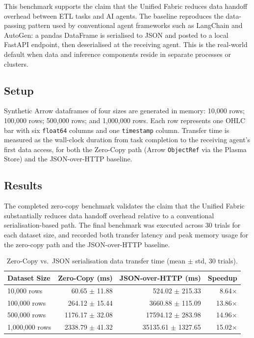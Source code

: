 \documentclass[12pt, a4paper]{report}
\begin{document}
This benchmark supports the claim that the Unified Fabric reduces data handoff
overhead between ETL tasks and AI agents.
The baseline reproduces the data-passing pattern used by conventional agent
frameworks such as LangChain and AutoGen: a pandas DataFrame is serialised to JSON
and posted to a local FastAPI endpoint, then deserialised at the receiving agent.
This is the real-world default when data and inference components reside in separate
processes or clusters.

\subsection{Setup}
\label{ssec:exp1_setup}

Synthetic Arrow dataframes of four sizes are generated in memory:
10,000 rows; 100,000 rows; 500,000 rows; and 1,000,000 rows.
Each row represents one OHLC bar with six \texttt{float64} columns and one
\texttt{timestamp} column.
Transfer time is measured as the wall-clock duration from task completion to the
receiving agent's first data access, for both the Zero-Copy path (Arrow
\texttt{ObjectRef} via the Plasma Store) and the JSON-over-HTTP baseline.

\subsection{Results}
\label{ssec:exp1_results}

The completed zero-copy benchmark validates the claim that the Unified Fabric
substantially reduces data handoff overhead relative to a conventional
serialisation-based path. The final benchmark was executed across 30 trials for each
dataset size, and recorded both transfer latency and peak memory usage for the
zero-copy path and the JSON-over-HTTP baseline.

\begin{table}[H]
  \centering
  \caption{Zero-Copy vs.\ JSON serialisation data transfer time
  (mean $\pm$ std, 30 trials).}
  \label{tab:zerocopy_results}
  \begin{tabular}{lrrr}
    \toprule
    \textbf{Dataset Size} &
    \textbf{Zero-Copy (ms)} &
    \textbf{JSON-over-HTTP (ms)} &
    \textbf{Speedup} \\
    \midrule
    10,000 rows    & 60.65 $\pm$ 11.88 & 524.02 $\pm$ 215.33 & 8.64$\times$ \\
    100,000 rows   & 264.12 $\pm$ 15.44 & 3660.88 $\pm$ 115.09 & 13.86$\times$ \\
    500,000 rows   & 1176.17 $\pm$ 32.08 & 17594.12 $\pm$ 283.98 & 14.96$\times$ \\
    1,000,000 rows & 2338.79 $\pm$ 41.32 & 35135.61 $\pm$ 1327.65 & 15.02$\times$ \\
    \bottomrule
  \end{tabular}
\end{table}
\end{document}
